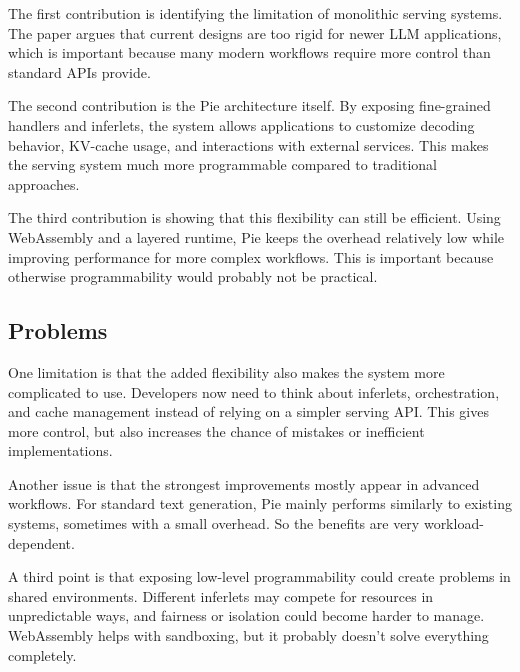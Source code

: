 \documentclass[a4paper, 12pt]{article}
\begin{document}
The first contribution is identifying the limitation of monolithic serving systems. The paper argues that current designs are too rigid for newer LLM applications, which is important because many modern workflows require more control than standard APIs provide.

The second contribution is the Pie architecture itself. By exposing fine-grained handlers and inferlets, the system allows applications to customize decoding behavior, KV-cache usage, and interactions with external services. This makes the serving system much more programmable compared to traditional approaches.

The third contribution is showing that this flexibility can still be efficient. Using WebAssembly and a layered runtime, Pie keeps the overhead relatively low while improving performance for more complex workflows. This is important because otherwise programmability would probably not be practical.

\subsection{Problems}

One limitation is that the added flexibility also makes the system more complicated to use. Developers now need to think about inferlets, orchestration, and cache management instead of relying on a simpler serving API. This gives more control, but also increases the chance of mistakes or inefficient implementations.

Another issue is that the strongest improvements mostly appear in advanced workflows. For standard text generation, Pie mainly performs similarly to existing systems, sometimes with a small overhead. So the benefits are very workload-dependent.

A third point is that exposing low-level programmability could create problems in shared environments. Different inferlets may compete for resources in unpredictable ways, and fairness or isolation could become harder to manage. WebAssembly helps with sandboxing, but it probably doesn’t solve everything completely.
\end{document}
